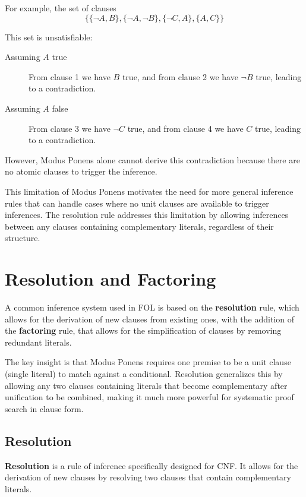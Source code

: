 For example, the set of clauses
\begin{equation}\label{eq:example_unsat}  
  \{\{\neg A, B\},\{\neg A , \neg B\}, \{\neg C , A\}, \{A , C\}\}
\end{equation}


This set is unsatisfiable:
\begin{description}
  \item[Assuming \(A\) true] From clause 1 we have \(B\) true, and from clause 2 we have \(\neg B\) true, leading to a contradiction.
  \item[Assuming \(A\) false] From clause 3 we have \(\neg C\) true, and from clause 4 we have \(C\) true, leading to a contradiction.
\end{description}
However, Modus Ponens alone cannot derive this contradiction because there are no atomic clauses to trigger the inference.

This limitation of Modus Ponens motivates the need for more general inference rules that can handle cases where no unit clauses are available to trigger inferences.
The resolution rule addresses this limitation by allowing inferences between any clauses containing complementary literals, regardless of their structure.

\section{Resolution and Factoring}

A common inference system used in FOL is based on the \textbf{resolution} rule, which allows for the derivation of new clauses from existing ones, with the addition of the \textbf{factoring} rule, that allows for the simplification of clauses by removing redundant literals.

The key insight is that Modus Ponens requires one premise to be a unit clause (single literal) to match against a conditional.
Resolution generalizes this by allowing any two clauses containing literals that become complementary after unification to be combined, making it much more powerful for systematic proof search in clause form.

\subsection{Resolution}

\textbf{Resolution} is a rule of inference specifically designed for CNF\@. It allows for the derivation of new clauses by resolving two clauses that contain complementary literals.

